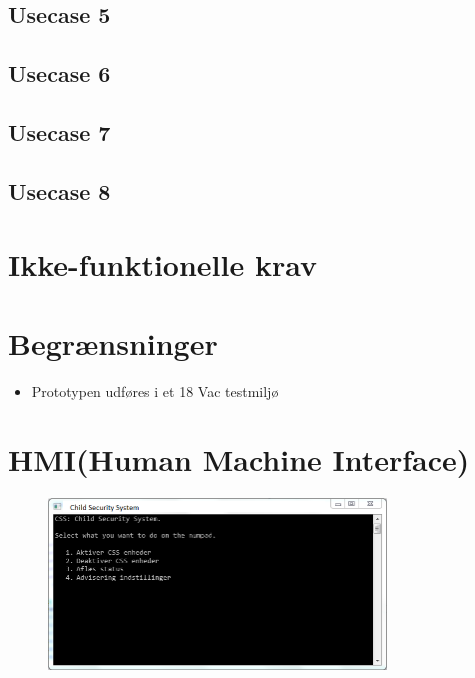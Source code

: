 \subsection{Usecase 5}


\subsection{Usecase 6}


\subsection{Usecase 7}



\subsection{Usecase 8}



\section{Ikke-funktionelle krav}



\section{Begrænsninger}
\begin{itemize}
\item Prototypen udføres i et 18 Vac testmiljø
\end{itemize}

\section{HMI(Human Machine Interface)}

\begin{figure}[h] \centering
{\includegraphics[width=0.8\textwidth]{billeder/cmdprompt/CSS_menu}}
\caption{}
\label{fig:CSS Menu}
\end{figure}

